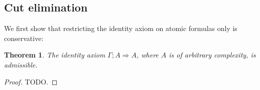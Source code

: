 \documentclass{article}
\newtheorem{theorem}{Theorem}
\begin{document}

\subsection{Cut elimination}

We first show that restricting the identity axiom on atomic formulas
only is conservative:

\begin{theorem}
  The identity axiom $\Gamma; A \Longrightarrow A$, where $A$ is of
  arbitrary complexity, is admissible.
\end{theorem}
\begin{proof}
  TODO.
\end{proof}
\end{document}
